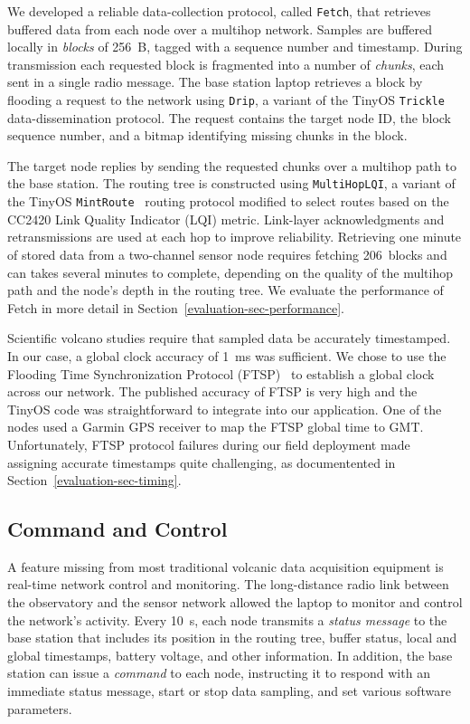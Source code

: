 We developed a reliable data-collection protocol, called \texttt{Fetch}, that
retrieves buffered data from each node over a multihop network. Samples are
buffered locally in \textit{blocks} of 256~B, tagged with a sequence number
and timestamp. During transmission each requested block is fragmented into a
number of \textit{chunks}, each sent in a single radio message. The base
station laptop retrieves a block by flooding a request to the network using
\texttt{Drip}, a variant of the TinyOS \texttt{Trickle}~\cite{trickle}
data-dissemination protocol. The request contains the target node ID, the
block sequence number, and a bitmap identifying missing chunks in the block. 

The target node replies by sending the requested chunks over a multihop path
to the base station. The routing tree is constructed using
\texttt{MultiHopLQI}, a variant of the TinyOS
\texttt{MintRoute}~\cite{awoo-multihop} routing protocol modified to select
routes based on the CC2420 Link Quality Indicator (LQI) metric. Link-layer
acknowledgments and retransmissions are used at each hop to improve
reliability. Retrieving one minute of stored data from a two-channel sensor
node requires fetching 206~blocks and can takes several minutes to complete,
depending on the quality of the multihop path and the node's depth in the
routing tree. We evaluate the performance of Fetch in more detail in
Section~\ref{evaluation-sec-performance}.

Scientific volcano studies require that sampled data be accurately
timestamped. In our case, a global clock accuracy of 1~ms was sufficient. We
chose to use the Flooding Time Synchronization Protocol (FTSP)~\cite{ftsp} to
establish a global clock across our network. The published accuracy of FTSP
is very high and the TinyOS code was straightforward to integrate into our
application. One of the nodes used a Garmin GPS receiver to map the FTSP
global time to GMT. Unfortunately, FTSP protocol failures during our field
deployment made assigning accurate timestamps quite challenging, as
documentented in Section~\ref{evaluation-sec-timing}.

\subsection{Command and Control}

A feature missing from most traditional volcanic data acquisition equipment
is real-time network control and monitoring. The long-distance radio link
between the observatory and the sensor network allowed the laptop to monitor
and control the network's activity. Every 10~s, each node transmits a
\textit{status message} to the base station that includes its position in the
routing tree, buffer status, local and global timestamps, battery voltage,
and other information. In addition, the base station can issue a
\textit{command} to each node, instructing it to respond with an immediate
status message, start or stop data sampling, and set various software
parameters. 

